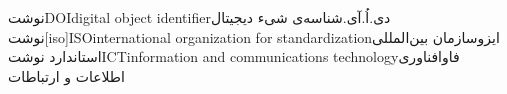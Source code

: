 
‌نوشت{DOI}{digital object identifier}{دی.اُ.آی.}{شناسه‌ی شیء دیجیتال}
‌نوشت[iso]{ISO}{international organization for standardization}{ایزو}{سازمان بین‌المللی استاندارد}
‌نوشت{ICT}{information and communications technology}{فاوا}{فناوری اطلاعات و ارتباطات}
